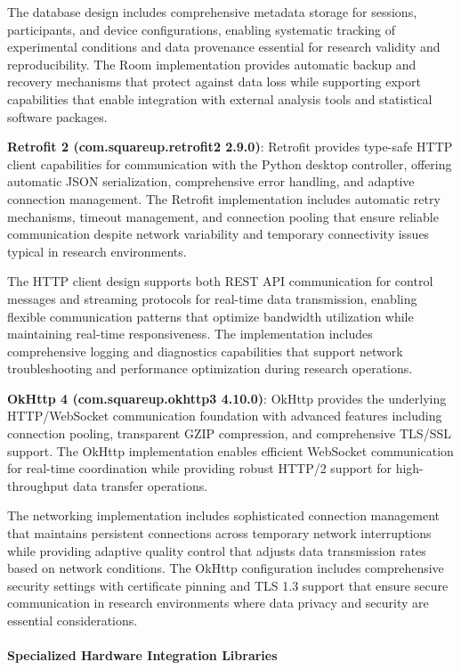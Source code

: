 \documentclass[12pt,a4paper]{article}
\begin{document}
The database design includes comprehensive metadata storage for sessions, participants, and device configurations,
enabling systematic tracking of experimental conditions and data provenance essential for research validity and
reproducibility. The Room implementation provides automatic backup and recovery mechanisms that protect against data
loss while supporting export capabilities that enable integration with external analysis tools and statistical software
packages.

\textbf{Retrofit 2 (com.squareup.retrofit2 2.9.0)}: Retrofit provides type-safe HTTP client capabilities for communication
with the Python desktop controller, offering automatic JSON serialization, comprehensive error handling, and adaptive
connection management. The Retrofit implementation includes automatic retry mechanisms, timeout management, and
connection pooling that ensure reliable communication despite network variability and temporary connectivity issues
typical in research environments.

The HTTP client design supports both REST API communication for control messages and streaming protocols for real-time
data transmission, enabling flexible communication patterns that optimize bandwidth utilization while maintaining
real-time responsiveness. The implementation includes comprehensive logging and diagnostics capabilities that support
network troubleshooting and performance optimization during research operations.

\textbf{OkHttp 4 (com.squareup.okhttp3 4.10.0)}: OkHttp provides the underlying HTTP/WebSocket communication foundation with
advanced features including connection pooling, transparent GZIP compression, and comprehensive TLS/SSL support. The
OkHttp implementation enables efficient WebSocket communication for real-time coordination while providing robust HTTP/2
support for high-throughput data transfer operations.

The networking implementation includes sophisticated connection management that maintains persistent connections across
temporary network interruptions while providing adaptive quality control that adjusts data transmission rates based on
network conditions. The OkHttp configuration includes comprehensive security settings with certificate pinning and TLS
1.3 support that ensure secure communication in research environments where data privacy and security are essential
considerations.

\paragraph{Specialized Hardware Integration Libraries}
\end{document}
